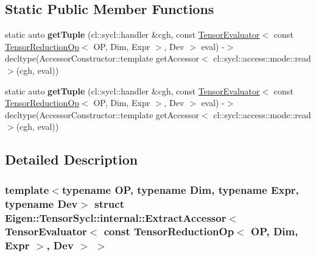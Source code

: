 \subsection*{Static Public Member Functions}
\begin{DoxyCompactItemize}
\item 
\mbox{\label{struct_eigen_1_1_tensor_sycl_1_1internal_1_1_extract_accessor_3_01_tensor_evaluator_3_01const_017b84cc42bd938fc0857672c2d814fbbd_a9807b599fdcff1ffbb36cf75d3cc52f1}} 
static auto {\bfseries get\+Tuple} (cl\+::sycl\+::handler \&cgh, const \hyperlink{struct_eigen_1_1_tensor_evaluator}{Tensor\+Evaluator}$<$ const \hyperlink{class_eigen_1_1_tensor_reduction_op}{Tensor\+Reduction\+Op}$<$ OP, Dim, Expr $>$, Dev $>$ eval) -\/$>$ decltype(Accessor\+Constructor\+::template get\+Accessor$<$ cl\+::sycl\+::access\+::mode\+::read $>$(cgh, eval))
\item 
\mbox{\label{struct_eigen_1_1_tensor_sycl_1_1internal_1_1_extract_accessor_3_01_tensor_evaluator_3_01const_017b84cc42bd938fc0857672c2d814fbbd_a9807b599fdcff1ffbb36cf75d3cc52f1}} 
static auto {\bfseries get\+Tuple} (cl\+::sycl\+::handler \&cgh, const \hyperlink{struct_eigen_1_1_tensor_evaluator}{Tensor\+Evaluator}$<$ const \hyperlink{class_eigen_1_1_tensor_reduction_op}{Tensor\+Reduction\+Op}$<$ OP, Dim, Expr $>$, Dev $>$ eval) -\/$>$ decltype(Accessor\+Constructor\+::template get\+Accessor$<$ cl\+::sycl\+::access\+::mode\+::read $>$(cgh, eval))
\end{DoxyCompactItemize}


\subsection{Detailed Description}
\subsubsection*{template$<$typename OP, typename Dim, typename Expr, typename Dev$>$\newline
struct Eigen\+::\+Tensor\+Sycl\+::internal\+::\+Extract\+Accessor$<$ Tensor\+Evaluator$<$ const Tensor\+Reduction\+Op$<$ O\+P, Dim, Expr $>$, Dev $>$ $>$}


